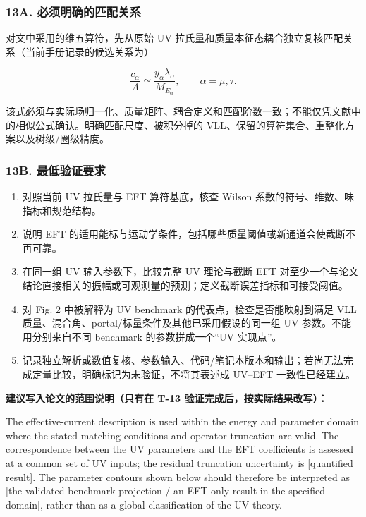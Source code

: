 \documentclass[
]{article}
\newenvironment{Shaded}{}{}
\newcommand{\NormalTok}[1]{#1}
\providecommand{\tightlist}{%
  \setlength{\itemsep}{0pt}\setlength{\parskip}{0pt}}
\begin{document}
\subsubsection{13A.
必须明确的匹配关系}\label{a.-ux5fc5ux987bux660eux786eux7684ux5339ux914dux5173ux7cfb}

对文中采用的维五算符，先从原始 UV
拉氏量和质量本征态耦合独立复核匹配关系（当前手册记录的候选关系为）

\[
\frac{c_\alpha}{\Lambda}\simeq
\frac{y_\alpha\lambda_\alpha}{M_{E_\alpha}},
\qquad \alpha=\mu,\tau.
\]

该式必须与实际场归一化、质量矩阵、耦合定义和匹配阶数一致；不能仅凭文献中的相似公式确认。明确匹配尺度、被积分掉的
VLL、保留的算符集合、重整化方案以及树级/圈级精度。

\subsubsection{13B.
最低验证要求}\label{b.-ux6700ux4f4eux9a8cux8bc1ux8981ux6c42}

\begin{enumerate}
\def\labelenumi{\arabic{enumi}.}
\tightlist
\item
  对照当前 UV 拉氏量与 EFT 算符基底，核查 Wilson
  系数的符号、维数、味指标和规范结构。
\item
  说明 EFT
  的适用能标与运动学条件，包括哪些质量阈值或新通道会使截断不再可靠。
\item
  在同一组 UV 输入参数下，比较完整 UV 理论与截断 EFT
  对至少一个与论文结论直接相关的振幅或可观测量的预测；定义截断误差指标和可接受阈值。
\item
  对 Fig. 2 中被解释为 UV benchmark 的代表点，检查是否能映射到满足 VLL
  质量、混合角、portal/标量条件及其他已采用假设的同一组 UV
  参数。不能用分别来自不同 benchmark 的参数拼成一个``UV 实现点''。
\item
  记录独立解析或数值复核、参数输入、代码/笔记本版本和输出；若尚无法完成定量比较，明确标记为未验证，不将其表述成
  UV--EFT 一致性已经建立。
\end{enumerate}

\textbf{建议写入论文的范围说明（只有在 T-13
验证完成后，按实际结果改写）：}

\begin{Shaded}
\begin{Highlighting}[]
\NormalTok{The effective{-}current description is used within the energy and}
\NormalTok{parameter domain where the stated matching conditions and operator}
\NormalTok{truncation are valid. The correspondence between the UV parameters}
\NormalTok{and the EFT coefficients is assessed at a common set of UV inputs;}
\NormalTok{the residual truncation uncertainty is [quantified result]. The}
\NormalTok{parameter contours shown below should therefore be interpreted as}
\NormalTok{[the validated benchmark projection / an EFT{-}only result in the}
\NormalTok{specified domain], rather than as a global classification of the UV}
\NormalTok{theory.}
\end{Highlighting}
\end{Shaded}
\end{document}

